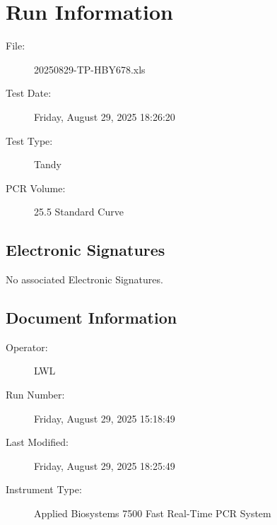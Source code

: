 \documentclass[UTF8,10pt,a4paper,fontset=fandol]{ctexart}
\newcommand{\fieldvalue}[1]{#1}
\begin{document}
\newpage

\section{Run Information}

\begin{description}
  \item[File:]
  \fieldvalue{20250829-TP-HBY678.xls}

  \item[Test Date:]
  \fieldvalue{Friday, August 29, 2025 18:26:20}

  \item[Test Type:]
  \fieldvalue{Tandy}

  \item[PCR Volume:]
  \fieldvalue{25.5 Standard Curve}
\end{description}

\subsection{Electronic Signatures}

No associated Electronic Signatures.

\subsection{Document Information}

\begin{description}
  \item[Operator:]
  \fieldvalue{LWL}

  \item[Run Number:]
  \fieldvalue{Friday, August 29, 2025 15:18:49}

  \item[Last Modified:]
  \fieldvalue{Friday, August 29, 2025 18:25:49}

  \item[Instrument Type:]
  \fieldvalue{Applied Biosystems 7500 Fast Real-Time PCR System}
\end{description}
\end{document}
